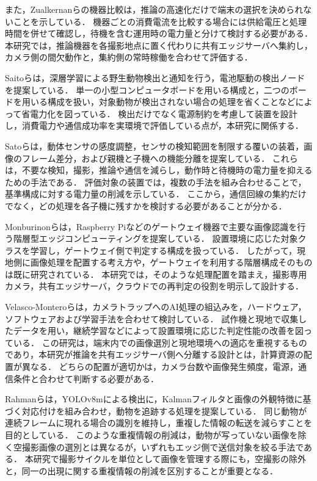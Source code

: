 また，Zualkernanら\cite{Zualkernan2022}の機器比較は，推論の高速化だけで端末の選択を決められないことを示している．
機器ごとの消費電流を比較する場合には供給電圧と処理時間を併せて確認し，待機を含む運用時の電力量と分けて検討する必要がある．
本研究では，推論機器を各撮影地点に置く代わりに共有エッジサーバへ集約し，カメラ側の間欠動作と，集約側の常時稼働を合わせて評価する．

Saitoら\cite{IEICE2020}は，深層学習による野生動物検出と通知を行う，電池駆動の検出ノードを提案している．
単一の小型コンピュータボードを用いる構成と，二つのボードを用いる構成を扱い，対象動物が検出されない場合の処理を省くことなどによって省電力化を図っている．
検出だけでなく電源制約を考慮して装置を設計し，消費電力や通信成功率を実環境で評価している点が，本研究に関係する．

Satoら\cite{Sato2022}は，動体センサの感度調整，センサの検知範囲を制限する覆いの装着，画像のフレーム差分，および親機と子機への機能分離を提案している．
これらは，不要な検知，撮影，推論や通信を減らし，動作時と待機時の電力量を抑えるための手法である．
評価対象の装置では，複数の手法を組み合わせることで，基準構成に対する電力量の削減を示している．
ここから，通信回線の集約だけでなく，どの処理を各子機に残すかを検討する必要があることが分かる．

Monburinonら\cite{Monburinon2019}は，Raspberry Piなどのゲートウェイ機器で主要な画像認識を行う階層型エッジコンピューティングを提案している．
設置環境に応じた対象クラスを学習し，ゲートウェイ側で判定する構成を扱っている．
したがって，現地側に画像処理を配置する考え方や，ゲートウェイを利用する階層構成そのものは既に研究されている．
本研究では，そのような処理配置を踏まえ，撮影専用カメラ，共有エッジサーバ，クラウドでの再判定の役割を明示して設計する．

Velasco-Monteroら\cite{Velasco2024}は，カメラトラップへのAI処理の組込みを，ハードウェア，ソフトウェアおよび学習手法を合わせて検討している．
試作機と現地で収集したデータを用い，継続学習などによって設置環境に応じた判定性能の改善を図っている．
この研究は，端末内での画像選別と現地環境への適応を重視するものであり，本研究が推論を共有エッジサーバ側へ分離する設計とは，計算資源の配置が異なる．
どちらの配置が適切かは，カメラ台数や画像発生頻度，電源，通信条件と合わせて判断する必要がある．

Rahmanら\cite{Computers2025}は，YOLOv8mによる検出に，Kalmanフィルタと画像の外観特徴に基づく対応付けを組み合わせ，動物を追跡する処理を提案している．
同じ動物が連続フレームに現れる場合の識別を維持し，重複した情報の転送を減らすことを目的としている．
このような重複情報の削減は，動物が写っていない画像を除く空撮影画像の選別とは異なるが，いずれもエッジ側で送信対象を絞る手法である．
本研究で撮影サイクルを単位として画像を管理する際にも，空撮影の除外と，同一の出現に関する重複情報の削減を区別することが重要となる．

